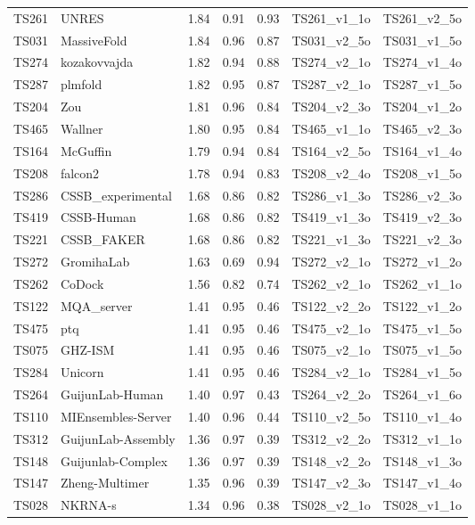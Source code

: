 \begin{longtable}{lllllll}
TS261 & UNRES & 1.84 & 0.91 & 0.93 & TS261\_v1\_1o & TS261\_v2\_5o \\ 
TS031 & MassiveFold & 1.84 & 0.96 & 0.87 & TS031\_v2\_5o & TS031\_v1\_5o \\ 
TS274 & kozakovvajda & 1.82 & 0.94 & 0.88 & TS274\_v2\_1o & TS274\_v1\_4o \\ 
TS287 & plmfold & 1.82 & 0.95 & 0.87 & TS287\_v2\_1o & TS287\_v1\_5o \\ 
TS204 & Zou & 1.81 & 0.96 & 0.84 & TS204\_v2\_3o & TS204\_v1\_2o \\ 
TS465 & Wallner & 1.80 & 0.95 & 0.84 & TS465\_v1\_1o & TS465\_v2\_3o \\ 
TS164 & McGuffin & 1.79 & 0.94 & 0.84 & TS164\_v2\_5o & TS164\_v1\_4o \\ 
TS208 & falcon2 & 1.78 & 0.94 & 0.83 & TS208\_v2\_4o & TS208\_v1\_5o \\ 
TS286 & CSSB\_experimental & 1.68 & 0.86 & 0.82 & TS286\_v1\_3o & TS286\_v2\_3o \\ 
TS419 & CSSB-Human & 1.68 & 0.86 & 0.82 & TS419\_v1\_3o & TS419\_v2\_3o \\ 
TS221 & CSSB\_FAKER & 1.68 & 0.86 & 0.82 & TS221\_v1\_3o & TS221\_v2\_3o \\ 
TS272 & GromihaLab & 1.63 & 0.69 & 0.94 & TS272\_v2\_1o & TS272\_v1\_2o \\ 
TS262 & CoDock & 1.56 & 0.82 & 0.74 & TS262\_v2\_1o & TS262\_v1\_1o \\ 
TS122 & MQA\_server & 1.41 & 0.95 & 0.46 & TS122\_v2\_2o & TS122\_v1\_2o \\ 
TS475 & ptq & 1.41 & 0.95 & 0.46 & TS475\_v2\_1o & TS475\_v1\_5o \\ 
TS075 & GHZ-ISM & 1.41 & 0.95 & 0.46 & TS075\_v2\_1o & TS075\_v1\_5o \\ 
TS284 & Unicorn & 1.41 & 0.95 & 0.46 & TS284\_v2\_1o & TS284\_v1\_5o \\ 
TS264 & GuijunLab-Human & 1.40 & 0.97 & 0.43 & TS264\_v2\_2o & TS264\_v1\_6o \\ 
TS110 & MIEnsembles-Server & 1.40 & 0.96 & 0.44 & TS110\_v2\_5o & TS110\_v1\_4o \\ 
TS312 & GuijunLab-Assembly & 1.36 & 0.97 & 0.39 & TS312\_v2\_2o & TS312\_v1\_1o \\ 
TS148 & Guijunlab-Complex & 1.36 & 0.97 & 0.39 & TS148\_v2\_2o & TS148\_v1\_3o \\ 
TS147 & Zheng-Multimer & 1.35 & 0.96 & 0.39 & TS147\_v2\_3o & TS147\_v1\_4o \\ 
TS028 & NKRNA-s & 1.34 & 0.96 & 0.38 & TS028\_v2\_1o & TS028\_v1\_1o \\ 

\end{longtable}
